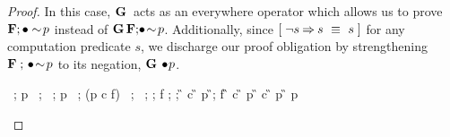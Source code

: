 \begin{proof}
  In this case, $\mathbf{G}\,$ acts as an everywhere operator which allows us to
  prove $\mathbf{F};\bullet \sim \! p$ instead of $\mathbf{G}\, \mathbf{F};\! \bullet \!
  \sim \! p$.  Additionally, since $[\;  \neg s \mathbin\Rightarrow s ~\equiv~ s
   \;]$ for any computation predicate $s$, we discharge our proof
  obligation by strengthening $\mathbf{F}\; ; \, \bullet \! \sim \! p$ to
  its negation, $\mathbf{G}\, \bullet \! p$.
    \begin{calculation}
    	\F \, ; \initially\! \spneg p
    	\F \, ; \X \, ; \initially \! \spneg p
    \hint{\follows}{ \eqref{eq:NEG} }
    	\F\, ; (p \land c \land f) \, ; \action \, ; \ctrue
	\F ;\! f ; \! \action ; \! \ctrue \wide{\land} \G \initially \! c \wide{\land} \G \initially \! p
    	\G  \F ; \! \initially f \wide{\land} \G \initially\! c \wide{\land} \G \initially \! p
    \hint{=}{ \eqref{eq:OP} }
    	\G \initially \! c \wide{\land} \G \initially \! p
    	\G \initially \! p
    \end{calculation}
%
%  

\end{proof}
